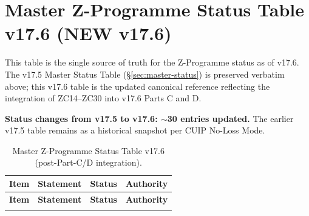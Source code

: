\documentclass[12pt, a4paper]{article}
\begin{document}
\section{Master Z-Programme Status Table v17.6 (NEW v17.6)}
\label{sec:master-status-v176}

\begin{keybox}[title={Master Z-Programme Status Table v17.6 (Canonical, Post-v17.6 Closures)}]
This table is the single source of truth for the Z-Programme status as
of v17.6. The v17.5 Master Status Table (\S\ref{sec:master-status})
is preserved verbatim above; this v17.6 table is the updated
canonical reference reflecting the integration of ZC14--ZC30
into v17.6 Parts C and D.

\textbf{Status changes from v17.5 to v17.6: $\sim$30 entries
updated.} The earlier v17.5 table remains as a historical snapshot
per CUIP No-Loss Mode.

{\small
\setlength{\LTpre}{4pt}\setlength{\LTpost}{4pt}
\renewcommand{\arraystretch}{1.30}
\begin{longtable}{p{2.8cm} p{6.5cm} p{1.8cm} p{3.4cm}}
\caption{Master Z-Programme Status Table v17.6 (post-Part-C/D integration).}\\
\toprule
\textbf{Item} & \textbf{Statement} & \textbf{Status} &
\textbf{Authority} \\
\midrule
\endfirsthead
\toprule
\textbf{Item} & \textbf{Statement} & \textbf{Status} &
\textbf{Authority} \\
\midrule
\endhead
\bottomrule
\endlastfoot


\end{longtable}}
\end{keybox}
\end{document}
